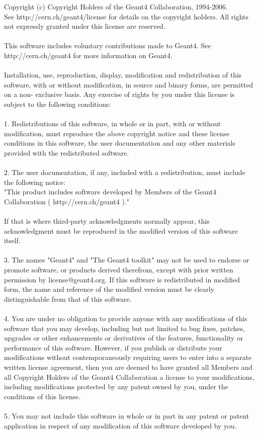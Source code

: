 \documentclass[12pt]{article}
\begin{document}
Copyright (c) Copyright Holders of the Geant4 Collaboration, 1994-2006.\\
See http://cern.ch/geant4/license for details on the copyright holders. All rights not expressly granted under this license are reserved.\\
 \\
This software includes voluntary contributions made to Geant4. See http://cern.ch/geant4 for more information on Geant4.\\
 \\
Installation, use, reproduction, display, modification and redistribution of this software, with or without modification, in source and binary forms, are permitted on a non- exclusive basis. Any exercise of rights by you under this license is subject to the following conditions:\\
 \\
1. Redistributions of this software, in whole or in part, with or without modification, must reproduce the above copyright notice and these license conditions in this software, the user documentation and any other materials provided with the redistributed software.\\
 \\
2. The user documentation, if any, included with a redistribution, must include the following notice:\\
"This product includes software developed by Members of the Geant4 Collaboration ( http://cern.ch/geant4 )."\\
 \\
If that is where third-party acknowledgments normally appear, this acknowledgment must be reproduced in the modified version of this software itself.\\
 \\
3. The names "Geant4" and "The Geant4 toolkit" may not be used to endorse or promote software, or products derived therefrom, except with prior written permission by license@geant4.org. If this software is redistributed in modified form, the name and reference of the modified version must be clearly distinguishable from that of this software.\\
 \\
4. You are under no obligation to provide anyone with any modifications of this software that you may develop, including but not limited to bug fixes, patches, upgrades or other enhancements or derivatives of the features, functionality or performance of this software. However, if you publish or distribute your modifications without contemporaneously requiring users to enter into a separate written license agreement, then you are deemed to have granted all Members and all Copyright Holders of the Geant4 Collaboration a license to your modifications, including modifications protected by any patent owned by you, under the conditions of this license.\\
 \\
5. You may not include this software in whole or in part in any patent or patent application in respect of any modification of this software developed by you.\\
 \\
 
\end{document}
